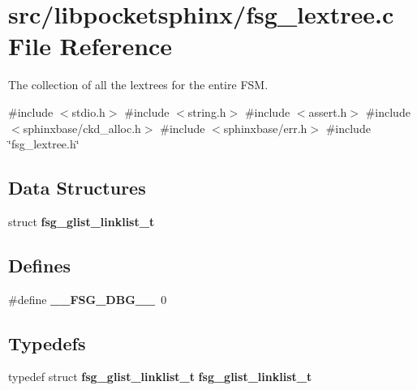 \section{src/libpocketsphinx/fsg\-\_\-lextree.c \-File \-Reference}
\label{fsg__lextree_8c}


\-The collection of all the lextrees for the entire \-F\-S\-M.  


{\ttfamily \#include $<$stdio.\-h$>$}\*
{\ttfamily \#include $<$string.\-h$>$}\*
{\ttfamily \#include $<$assert.\-h$>$}\*
{\ttfamily \#include $<$sphinxbase/ckd\-\_\-alloc.\-h$>$}\*
{\ttfamily \#include $<$sphinxbase/err.\-h$>$}\*
{\ttfamily \#include \char`\"{}fsg\-\_\-lextree.\-h\char`\"{}}\*
\subsection*{\-Data \-Structures}
\begin{DoxyCompactItemize}
\item 
struct {\bf fsg\-\_\-glist\-\_\-linklist\-\_\-t}
\end{DoxyCompactItemize}
\subsection*{\-Defines}
\begin{DoxyCompactItemize}
\item 
\#define {\bfseries \-\_\-\-\_\-\-F\-S\-G\-\_\-\-D\-B\-G\-\_\-\-\_\-}~0\label{fsg__lextree_8c_a7acaaaaea00ab148fa241f7ce86cab14}

\end{DoxyCompactItemize}
\subsection*{\-Typedefs}
\begin{DoxyCompactItemize}
\item 
typedef struct {\bf fsg\-\_\-glist\-\_\-linklist\-\_\-t} {\bfseries fsg\-\_\-glist\-\_\-linklist\-\_\-t}\label{fsg__lextree_8c_a0ed5b76987ef1e416b40a06a9d80902f}

\end{DoxyCompactItemize}
